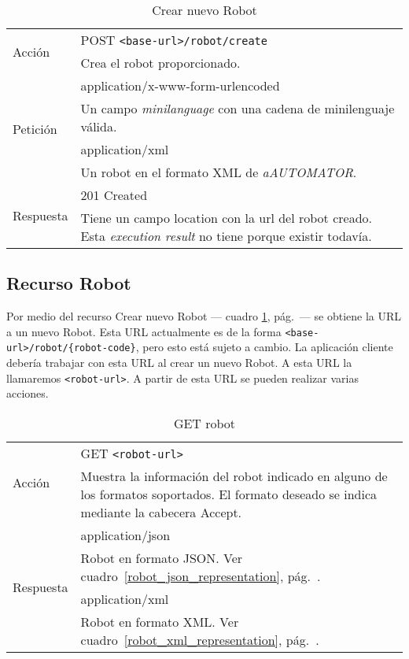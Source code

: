 \begin{table}[hp]
\begin{tabularx}{\textwidth}{l X}
\multirow{2}{*}{Acción}
 & POST \verb+<base-url>/robot/create+ \\
 & Crea el robot proporcionado.\\ \hline
\multirow{4}{*}{Petición}
 & application/x-www-form-urlencoded \\
 & Un campo \emph{minilanguage} con una cadena de
  minilenguaje válida.\\ \cline{2-2}
 & application/xml \\
 & Un robot en el formato XML de \emph{aAUTOMATOR}.\\ \hline
\multirow{2}{*}{Respuesta}
& 201 Created \\
& Tiene un campo location con la url del robot creado.
Esta \emph{execution result} no tiene porque existir todavía.\\
\end{tabularx}
\caption{Crear nuevo Robot}
\label{create_new_robot}
\end{table}
\newpage

\subsection{Recurso Robot}

Por medio del recurso Crear nuevo Robot --- cuadro
\ref{create_new_robot}, pág.~\pageref{create_new_robot}--- se obtiene
la URL a un nuevo Robot. Esta URL actualmente es de la forma
\verb+<base-url>/robot/{robot-code}+, pero esto está sujeto a
cambio. La aplicación cliente debería trabajar con esta URL al crear
un nuevo Robot. A esta URL la llamaremos \verb+<robot-url>+. A partir
de esta URL se pueden realizar varias acciones.

\begin{table}
\begin{tabularx}{\textwidth}{l X}
\multirow{2}{*}{Acción}
 & GET \verb+<robot-url>+ \\
 & Muestra la información del robot indicado en alguno de los formatos
soportados. El formato deseado se indica mediante la cabecera Accept.\\ \hline
\multirow{4}{*}{Respuesta}
& application/json \\
& Robot en formato JSON. Ver cuadro~\ref{robot_json_representation}, pág.~\pageref{robot_json_representation}. \\ \cline{2-2}
& application/xml \\
& Robot en formato XML. Ver cuadro~\ref{robot_xml_representation}, pág.~\pageref{robot_xml_representation}. \\
\end{tabularx}
\caption{GET robot}
\label{get_robot}
\end{table}

